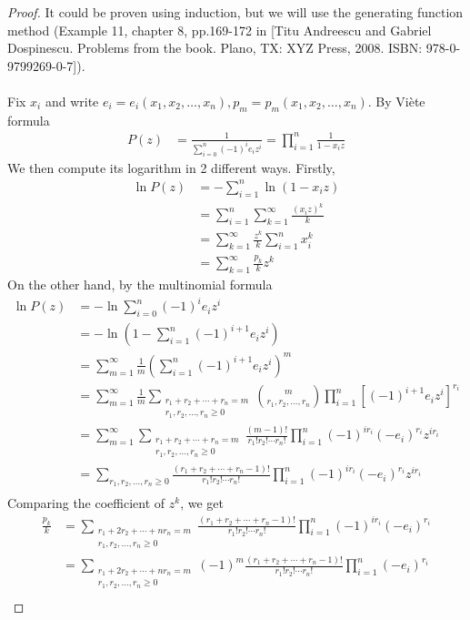 \documentclass{treatise}
\begin{document}
\begin{proof}
It could be proven using induction, but we will use the generating function method (Example 11, chapter 8, pp.169-172 in [Titu Andreescu and Gabriel Dospinescu. Problems from the book. Plano, TX: XYZ Press, 2008. ISBN: 978-0-9799269-0-7]).
\\
\\
Fix $x_i$ and write $e_i = e_i (x_1, x_2, \hdots, x_n), p_m = p_m (x_1, x_2, \hdots, x_n)$. By Viète formula
\begin{align*}
P(z) & = \frac{1}{\sum_{i = 0}^n (-1)^i e_i z^i} = \prod_{i = 1}^n \frac{1}{1 - x_i z}
\end{align*}
We then compute its logarithm in 2 different ways. Firstly,
\begin{align*}
\ln P(z) & = - \sum_{i = 1}^n \ln (1 - x_i z) \\
& = \sum_{i = 1}^n \sum_{k = 1}^\infty \frac{(x_i z)^k}{k} \\
& = \sum_{k = 1}^\infty \frac{z^k}{k} \sum_{i = 1}^n x_i^k \\
& = \sum_{k = 1}^\infty \frac{p_k}{k} z^k
\end{align*}
On the other hand, by the multinomial formula
\begin{align*}
\ln P(z) & = - \ln \sum_{i = 0}^n (-1)^i e_i z^i \\
& = - \ln \left( 1 - \sum_{i = 1}^n (-1)^{i + 1} e_i z^i \right) \\
& = \sum_{m = 1}^\infty \frac{1}{m} \left( \sum_{i = 1}^n (-1)^{i + 1} e_i z^i \right)^m \\
& = \sum_{m = 1}^\infty \frac{1}{m} \sum_{\substack{r_1 + r_2 + \cdots + r_n = m \\ r_1, r_2, \hdots, r_n \geq 0}} {m \choose r_1, r_2, \hdots, r_n} \prod_{i = 1}^n \left[ (-1)^{i + 1}  e_i z^i\right]^{r_i} \\
& = \sum_{m = 1}^\infty \sum_{\substack{r_1 + r_2 + \cdots + r_n = m \\ r_1, r_2, \hdots, r_n \geq 0}} \frac{(m - 1)!}{r_1! r_2! \cdots r_n!} \prod_{i = 1}^n (-1)^{i r_i} (-e_i)^{r_i} z^{i r_i} \\
& = \sum_{r_1, r_2, \hdots, r_n \geq 0} \frac{(r_1 + r_2 + \cdots + r_n - 1)!}{r_1! r_2! \cdots r_n!} \prod_{i = 1}^n (-1)^{i r_i} (-e_i)^{r_i} z^{i r_i} \\
\end{align*}
Comparing the coefficient of $z^k$, we get
\begin{align*}
\frac{p_k}{k} & = \sum_{\substack{r_1 + 2r_2 + \cdots + n r_n = m \\ r_1, r_2, \hdots, r_n \geq 0}} \frac{(r_1 + r_2 + \cdots + r_n - 1)!}{r_1! r_2! \cdots r_n!} \prod_{i = 1}^n (-1)^{i r_i} (-e_i)^{r_i} \\
& = \sum_{\substack{r_1 + 2r_2 + \cdots + n r_n = m \\ r_1, r_2, \hdots, r_n \geq 0}} (-1)^m \frac{(r_1 + r_2 + \cdots + r_n - 1)!}{r_1! r_2! \cdots r_n!} \prod_{i = 1}^n (-e_i)^{r_i} \\
\end{align*}
\end{proof}
\end{document}
